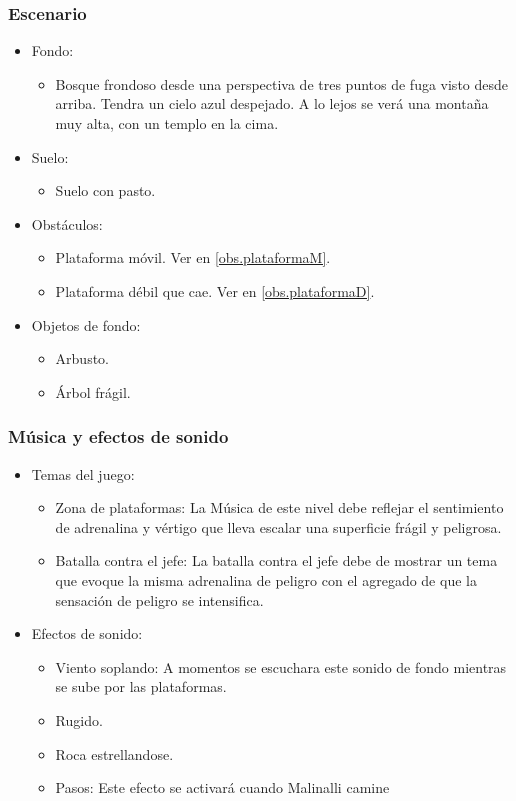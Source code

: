 \documentclass[11pt,letterpaper]{article}
\begin{document}
\subsubsection{Escenario}
\begin{itemize} 
	\item Fondo:
\begin{itemize}
	\item Bosque frondoso desde una perspectiva de tres puntos de fuga visto desde arriba. Tendra un cielo azul despejado. A lo lejos se verá una montaña muy alta, con un templo en la cima.
\end{itemize}
	\item Suelo:
		\begin{itemize}
			\item Suelo con pasto.
		\end{itemize}
	\item Obstáculos:
		\begin{itemize}
			\item Plataforma móvil. Ver en \ref{obs.plataformaM}.
			\item Plataforma débil que cae. Ver en \ref{obs.plataformaD}.
		\end{itemize}
	\item Objetos de fondo:
		\begin{itemize}
			\item Arbusto.
			\item Árbol frágil.
		\end{itemize}
\end{itemize}	
	\subsubsection{Música y efectos de sonido}
\begin{itemize}
	\item Temas del juego:
		\begin{itemize}
			\item Zona de plataformas: La Música  de este nivel debe reflejar el sentimiento de adrenalina y vértigo que lleva escalar una superficie frágil y peligrosa.
			\item Batalla contra el jefe: La batalla contra el jefe debe de mostrar un tema que evoque la misma adrenalina de peligro con el agregado de que la sensación de peligro se intensifica.
		\end{itemize}
	\item Efectos de sonido:
		\begin{itemize}
			\item Viento soplando: A momentos se escuchara este sonido de fondo mientras se sube por las plataformas.
			\item Rugido.
			\item Roca estrellandose.
			\item Pasos: Este efecto se activará cuando Malinalli camine
		\end{itemize}
\end{itemize} 
\end{document}
